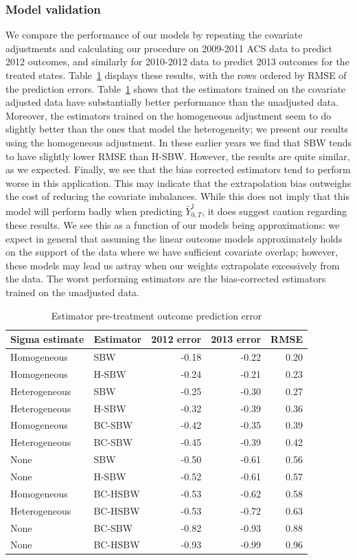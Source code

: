 \documentclass[aoas]{imsart}
\theoremstyle{plain}
\theoremstyle{remark}
\begin{document}
\subsubsection{Model validation}

We compare the performance of our models by repeating the covariate adjustments and calculating our procedure on 2009-2011 ACS data to predict 2012 outcomes, and similarly for 2010-2012 data to predict 2013 outcomes for the treated states. Table~\ref{tab:pretxpred} displays these results, with the rows ordered by RMSE of the prediction errors. Table~\ref{tab:pretxpred} shows that the estimators trained on the covariate adjusted data have substantially better performance than the unadjusted data. Moreover, the estimators trained on the homogeneous adjustment seem to do slightly better than the ones that model the heterogeneity; we present our results using the homogeneous adjustment. In these earlier years we find that SBW tends to have slightly lower RMSE than H-SBW. However, the results are quite similar, as we expected. Finally, we see that the bias corrected estimators tend to perform worse in this application. This may indicate that the extrapolation bias outweighs the cost of reducing the covariate imbalances. While this does not imply that this model will perform badly when predicting $\bar{Y}^1_{0, T}$, it does suggest caution regarding these results. We see this as a function of our models being approximations: we expect in general that assuming the linear outcome models approximately holds on the support of the data where we have sufficient covariate overlap; however, these models may lead us astray when our weights extrapolate excessively from the data. The worst performing estimators are the bias-corrected estimators trained on the unadjusted data.

\begin{table}[ht]
\caption{Estimator pre-treatment outcome prediction error}\label{tab:pretxpred}
\begin{tabular}{llrrr}
  \hline
Sigma estimate & Estimator & 2012 error & 2013 error & RMSE \\ 
  \hline
Homogeneous & SBW & -0.18 & -0.22 & 0.20 \\ 
  Homogeneous & H-SBW & -0.24 & -0.21 & 0.23 \\ 
  Heterogeneous & SBW & -0.25 & -0.30 & 0.27 \\ 
  Heterogeneous & H-SBW & -0.32 & -0.39 & 0.36 \\ 
  Homogeneous & BC-SBW & -0.42 & -0.35 & 0.39 \\ 
  Heterogeneous & BC-SBW & -0.45 & -0.39 & 0.42 \\ 
  None & SBW & -0.50 & -0.61 & 0.56 \\ 
  None & H-SBW & -0.52 & -0.61 & 0.57 \\ 
  Homogeneous & BC-HSBW & -0.53 & -0.62 & 0.58 \\ 
  Heterogeneous & BC-HSBW & -0.53 & -0.72 & 0.63 \\ 
  None & BC-SBW & -0.82 & -0.93 & 0.88 \\ 
  None & BC-HSBW & -0.93 & -0.99 & 0.96 \\ 
   \hline
\end{tabular}
\end{table}
\end{document}
